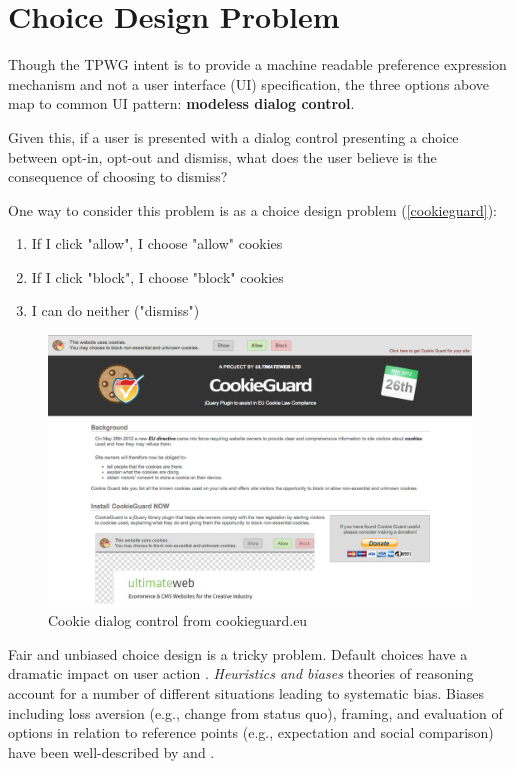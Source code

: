 \section{Choice Design Problem}
\label{choicedesignproblem}

Though the TPWG intent is to provide a machine readable preference expression mechanism and not a user interface (UI) specification, the three options above map to common UI pattern: \textbf{modeless dialog control}. 

Given this, if a user is presented with a dialog control presenting a choice between opt-in, opt-out and dismiss, what does the user believe is the consequence of choosing to dismiss?

One way to consider this problem is as a choice design problem (\autoref{cookieguard}):
\begin{enumerate}
\item If I click "allow",  I choose "allow" cookies
\item If I click "block", I choose "block" cookies
\item I can do neither ("dismiss")
\end{enumerate}

\begin{figure}
\begin{center}
 \includegraphics[scale=.25]{chapter5.tex/cookieguard}
\caption{Cookie dialog control from cookieguard.eu}
\label{cookieguard}
\end{center}
\end{figure}

Fair and unbiased choice design is a tricky problem. Default choices have a dramatic impact on user action  \citep{Johnson:2002vb}.  \emph{Heuristics and biases} theories of reasoning account for a number of different situations leading to systematic bias. Biases including loss aversion (e.g., change from status quo), framing, and evaluation of options in relation to reference points (e.g., expectation and social comparison) have been well-described by  \cite{Tversky:1981vc} and \cite{Kahneman:1984td}. 

